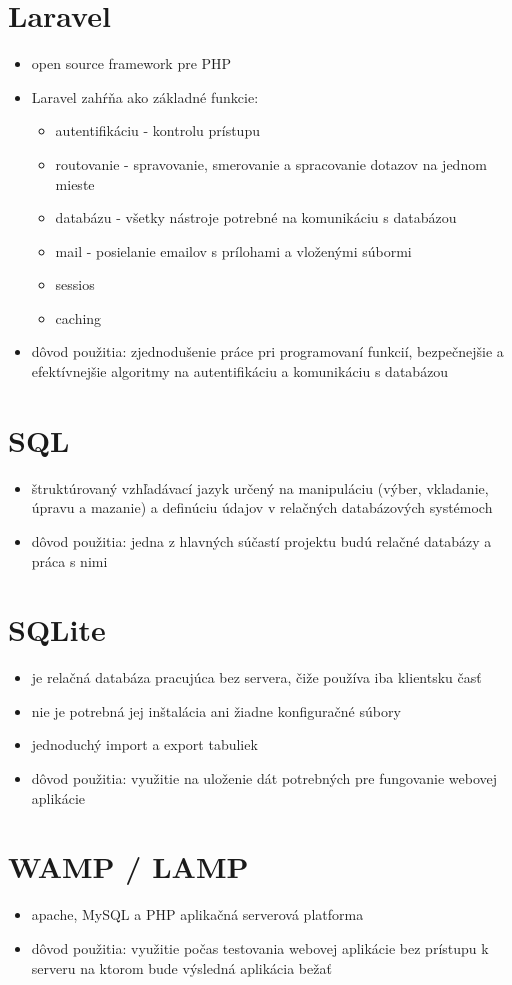 \documentclass[12pt,a4paper]{report}
\theoremstyle{definition}
\theoremstyle{remark}
\begin{document}
\section{Laravel}
\begin{itemize}
\item open source framework pre PHP
\item Laravel zahŕňa ako základné funkcie:
	
	\begin{itemize}
	\item autentifikáciu - kontrolu prístupu
	\item routovanie - spravovanie, smerovanie a spracovanie dotazov na jednom mieste
	\item databázu - všetky nástroje potrebné na komunikáciu s databázou
	\item mail - posielanie emailov s prílohami a vloženými súbormi
	\item sessios
	\item caching 
	\end{itemize}

\item dôvod použitia: zjednodušenie práce pri programovaní funkcií, bezpečnejšie a efektívnejšie algoritmy na autentifikáciu a komunikáciu s databázou
\end{itemize}

\section{SQL}
\begin{itemize}
\item štruktúrovaný vzhľadávací jazyk určený na manipuláciu (výber, vkladanie, úpravu a mazanie) a definúciu údajov v relačných databázových systémoch
\item dôvod použitia: jedna z hlavných súčastí projektu budú relačné databázy a práca s nimi
\end{itemize}

\section{SQLite}
\begin{itemize}
\item je relačná databáza pracujúca bez servera, čiže používa iba klientsku časť
\item nie je potrebná jej inštalácia ani žiadne konfiguračné súbory
\item jednoduchý import a export tabuliek
\item dôvod použitia: využitie na uloženie dát potrebných pre fungovanie webovej aplikácie
\end{itemize}

\section{WAMP / LAMP}
\begin{itemize}
\item apache, MySQL a PHP aplikačná serverová platforma
\item dôvod použitia: využitie počas testovania webovej aplikácie bez prístupu k serveru na ktorom bude výsledná aplikácia bežať
\end{itemize}
\end{document}
